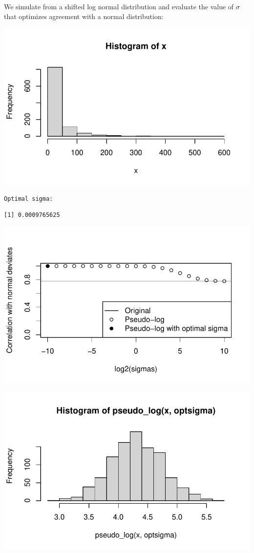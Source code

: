 \documentclass[
  letterpaper,
  DIV=11,
  numbers=noendperiod]{scrreport}
\begin{document}
We simulate from a shifted log normal distribution and evaluate the
value of \(\sigma\) that optimizes agreement with a normal distribution:

\includegraphics{./Pseudo_log_explainer_files/figure-pdf/pl06-1.pdf}

\begin{verbatim}
Optimal sigma: 
\end{verbatim}

\begin{verbatim}
[1] 0.0009765625
\end{verbatim}

\includegraphics{./Pseudo_log_explainer_files/figure-pdf/pl06-2.pdf}

\includegraphics{./Pseudo_log_explainer_files/figure-pdf/pl06-3.pdf}
\end{document}
